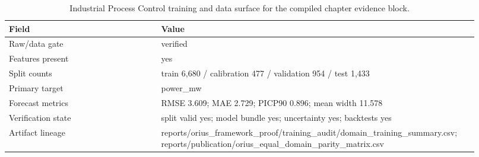 \begin{table}[htbp]
\centering
\small
\caption{Industrial Process Control training and data surface for the compiled chapter evidence block.}
\label{tab:industrial-training-surface}
\begin{tabular}{p{0.31\linewidth}p{0.61\linewidth}}
\toprule
\textbf{Field} & \textbf{Value}\\
\midrule
Raw/data gate & verified\\
Features present & yes\\
Split counts & train 6,680 / calibration 477 / validation 954 / test 1,433\\
Primary target & power\_mw\\
Forecast metrics & RMSE 3.609; MAE 2.729; PICP90 0.896; mean width 11.578\\
Verification state & split valid yes; model bundle yes; uncertainty yes; backtests yes\\
Artifact lineage & reports/orius\_framework\_proof/training\_audit/domain\_training\_summary.csv; reports/publication/orius\_equal\_domain\_parity\_matrix.csv\\
\bottomrule
\end{tabular}
\end{table}
